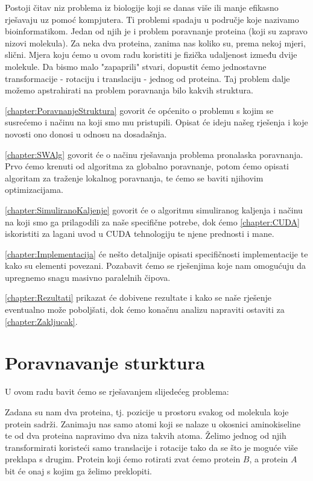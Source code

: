 \documentclass[times, utf8, zavrsni]{fer}
\begin{document}
Postoji čitav niz problema iz biologije koji se danas više ili manje efikasno
rješavaju uz pomoć kompjutera. Ti problemi spadaju u područje koje nazivamo
bioinformatikom. Jedan od njih je i problem poravnanje proteina (koji su
zapravo nizovi molekula). Za neka dva proteina, zanima nas koliko
su, prema nekoj mjeri, slični. Mjera koju ćemo u ovom radu koristiti
je fizička udaljenost između dvije molekule. Da bismo malo "zapaprili" stvari,
dopustit ćemo jednostavne transformacije - rotaciju i translaciju - jednog
od proteina. Taj problem dalje možemo apstrahirati na problem poravnanja
bilo kakvih struktura. 

\autoref{chapter:PoravnanjeStruktura} govorit će općenito o problemu s kojim
se susrećemo i načinu na koji smo mu pristupili. Opisat će ideju
našeg rješenja i koje novosti ono donosi u odnosu na dosadašnja.

\autoref{chapter:SWAlg} govorit će o načinu rješavanja problema
pronalaska poravnanja. Prvo ćemo krenuti od algoritma za globalno
poravnanje, potom ćemo opisati algoritam za traženje lokalnog poravnanja,
te ćemo se baviti njihovim optimizacijama.

\autoref{chapter:SimuliranoKaljenje} govorit će o algoritmu simuliranog
kaljenja i načinu na koji smo ga prilagodili za naše specifične potrebe, 
dok ćemo \autoref{chapter:CUDA} iskoristiti za lagani uvod u CUDA
tehnologiju te njene prednosti i mane.

\autoref{chapter:Implementacija} će nešto detaljnije opisati
specifičnosti implementacije te kako su elementi povezani. Pozabavit ćemo
se rješenjima koje nam omogućuju da upregnemo snagu masivno paralelnih
čipova.

\autoref{chapter:Rezultati} prikazat će dobivene rezultate i kako se
naše rješenje eventualno može po{\-}bo{\-}lj{\-}ša{\-}ti, dok ćemo konačnu analizu
napraviti ostaviti za \autoref{chapter:Zakljucak}.



\chapter{Poravnavanje sturktura}
\label{chapter:PoravnanjeStruktura}
U ovom radu bavit ćemo se rješavanjem slijedećeg problema: 

Zadana su nam dva proteina, tj. pozicije u prostoru svakog od molekula
koje protein sadrži. Zanimaju nas samo atomi koji se nalaze u okosnici
aminokiseline te od dva proteina napravimo dva niza takvih atoma. Želimo
jednog od njih transformirati 
koristeći samo translacije i rotacije tako da se što je moguće više
preklapa s drugim. Protein koji ćemo rotirati zvat ćemo protein $B$,
a protein $A$ bit će onaj s kojim ga želimo preklopiti. 
\end{document}
